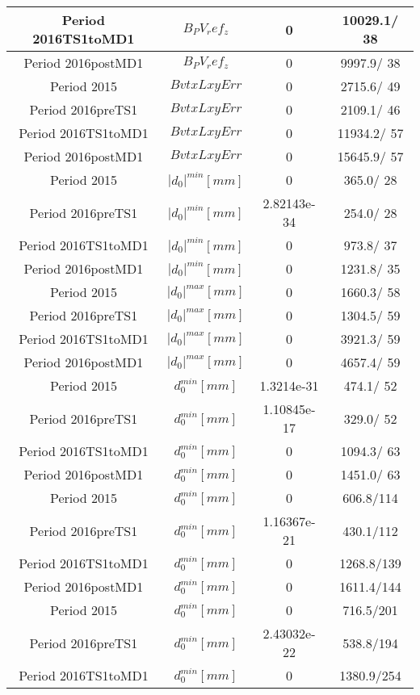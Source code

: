 \documentclass{article}
\begin{document}
\begin{longtable}{c|c|c|c}
\hline
 Period 2016TS1toMD1 & $B_PV_ref_z$ & 0 & 10029.1/ 38\\
\hline
 Period 2016postMD1 & $B_PV_ref_z$ & 0 & 9997.9/ 38\\
\hline
 Period 2015 & $BvtxLxyErr$ & 0 & 2715.6/ 49\\
\hline
 Period 2016preTS1 & $BvtxLxyErr$ & 0 & 2109.1/ 46\\
\hline
 Period 2016TS1toMD1 & $BvtxLxyErr$ & 0 & 11934.2/ 57\\
\hline
 Period 2016postMD1 & $BvtxLxyErr$ & 0 & 15645.9/ 57\\
\hline
 Period 2015 & $|d_{0}|^{min} [mm]$ & 0 & 365.0/ 28\\
\hline
 Period 2016preTS1 & $|d_{0}|^{min} [mm]$ & 2.82143e-34 & 254.0/ 28\\
\hline
 Period 2016TS1toMD1 & $|d_{0}|^{min} [mm]$ & 0 & 973.8/ 37\\
\hline
 Period 2016postMD1 & $|d_{0}|^{min} [mm]$ & 0 & 1231.8/ 35\\
\hline
 Period 2015 & $|d_{0}|^{max} [mm]$ & 0 & 1660.3/ 58\\
\hline
 Period 2016preTS1 & $|d_{0}|^{max} [mm]$ & 0 & 1304.5/ 59\\
\hline
 Period 2016TS1toMD1 & $|d_{0}|^{max} [mm]$ & 0 & 3921.3/ 59\\
\hline
 Period 2016postMD1 & $|d_{0}|^{max} [mm]$ & 0 & 4657.4/ 59\\
\hline
 Period 2015 & $d_{0}^{min} [mm]$ & 1.3214e-31 & 474.1/ 52\\
\hline
 Period 2016preTS1 & $d_{0}^{min} [mm]$ & 1.10845e-17 & 329.0/ 52\\
\hline
 Period 2016TS1toMD1 & $d_{0}^{min} [mm]$ & 0 & 1094.3/ 63\\
\hline
 Period 2016postMD1 & $d_{0}^{min} [mm]$ & 0 & 1451.0/ 63\\
\hline
 Period 2015 & $d_{0}^{min} [mm]$ & 0 & 606.8/114\\
\hline
 Period 2016preTS1 & $d_{0}^{min} [mm]$ & 1.16367e-21 & 430.1/112\\
\hline
 Period 2016TS1toMD1 & $d_{0}^{min} [mm]$ & 0 & 1268.8/139\\
\hline
 Period 2016postMD1 & $d_{0}^{min} [mm]$ & 0 & 1611.4/144\\
\hline
 Period 2015 & $d_{0}^{min} [mm]$ & 0 & 716.5/201\\
\hline
 Period 2016preTS1 & $d_{0}^{min} [mm]$ & 2.43032e-22 & 538.8/194\\
\hline
 Period 2016TS1toMD1 & $d_{0}^{min} [mm]$ & 0 & 1380.9/254\\

\end{longtable}
\end{document}
